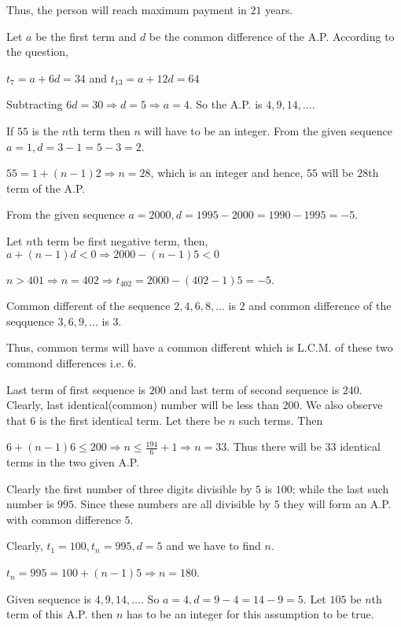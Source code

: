   Thus, the person will reach maximum payment in $21$ years.
\item Let $a$ be the first term and $d$ be the common difference of the A.P. According to the question,

  $t_7 = a + 6d = 34$ and $t_{13} = a + 12d = 64$

  Subtracting $6d = 30 \Rightarrow d = 5 \Rightarrow a = 4$. So the A.P. is $4, 9, 14, \ldots$.
\item If $55$ is the $n$th term then $n$ will have to be an integer. From the given sequence $a = 1, d = 3 - 1 = 5 - 3 = 2$.

  $55 = 1 + (n - 1)2 \Rightarrow n = 28$, which is an integer and hence, $55$ will be $28$th term of the A.P.
\item From the given sequence $a = 2000, d = 1995 - 2000 = 1990 - 1995 = -5$.

  Let $n$th term be first negative term, then, $a + (n - 1)d < 0 \Rightarrow 2000 -(n - 1)5 < 0$

  \Rightarrow $n > 401 \Rightarrow n = 402 \Rightarrow t_{402} = 2000 - (402 - 1)5 = -5$.
\item Common different of the sequence $2, 4, 6, 8, \ldots$ is $2$ and common difference of the seqquence $3, 6, 9, \ldots$ is $3$.

  Thus, common terms will have a common different which is L.C.M. of these two commond differences i.e. $6$.

  Last term of first sequence is $200$ and last term of second sequence is $240$. Clearly, last identical(common) number will be
  less than $200$. We also observe that $6$ is the first identical term. Let there be $n$ such terms. Then

  $6 + (n - 1)6 \leq 200 \Rightarrow n\leq \frac{194}{6} + 1 \Rightarrow n = 33$. Thus there will be $33$ identical terms in the two
  given A.P.
\item Clearly the first number of three digits divisible by $5$ is $100$; while the last such number is $995$. Since these numbers
  are all divisible by $5$ they will form an A.P. with common difference $5$.

  Clearly, $t_1 = 100, t_n = 995, d = 5$ and we have to find $n$.

  $t_n = 995 = 100 + (n - 1)5\Rightarrow n = 180$.
\item Given sequence is $4, 9, 14, \ldots$. So $a = 4, d = 9 - 4 = 14 - 9 = 5$. Let $105$ be $n$th term of this A.P. then $n$ has
  to be an integer for this assumption to be true.

